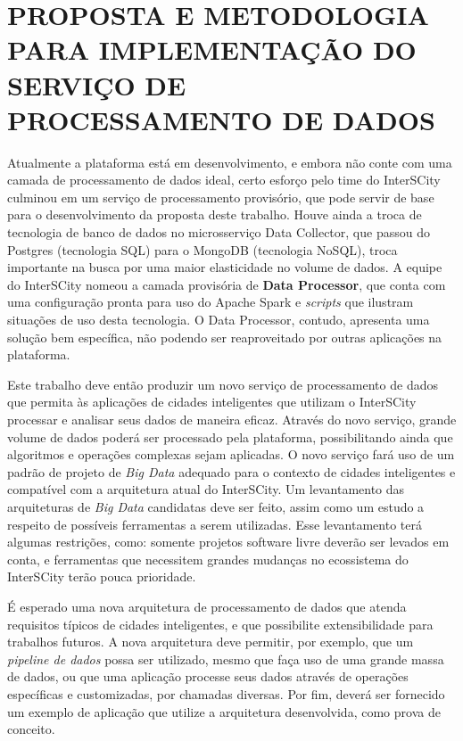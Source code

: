 \section{PROPOSTA E METODOLOGIA PARA IMPLEMENTAÇÃO DO SERVIÇO DE PROCESSAMENTO DE DADOS}

Atualmente a plataforma está em desenvolvimento, e embora não conte
com uma camada de processamento de dados ideal, certo esforço pelo time do
InterSCity culminou em um serviço de processamento provisório, que pode servir
de base para o desenvolvimento da proposta deste trabalho. Houve ainda a
troca de tecnologia de banco de dados no microsserviço Data Collector, que
passou do Postgres (tecnologia SQL) para o MongoDB (tecnologia NoSQL), troca
importante na busca por uma maior elasticidade no volume de dados. A equipe
do InterSCity nomeou a camada provisória de \textbf{Data Processor}, que
conta com uma configuração pronta para uso do Apache Spark e
\textit{scripts} que ilustram situações de uso desta tecnologia. O Data
Processor, contudo, apresenta uma solução bem específica, não podendo ser
reaproveitado por outras aplicações na plataforma.

Este trabalho deve então produzir um novo serviço de processamento de dados que
permita às aplicações de cidades inteligentes que utilizam o InterSCity
processar e analisar seus dados de maneira eficaz. Através do novo serviço,
grande volume de dados poderá ser processado pela plataforma, possibilitando
ainda que algoritmos e operações complexas sejam aplicadas. O novo serviço fará
uso de um padrão de projeto de \textit{Big Data} adequado para o contexto de cidades
inteligentes e compatível com a arquitetura atual do InterSCity. Um
levantamento das arquiteturas de \textit{Big Data} candidatas deve ser feito, assim
como um estudo a respeito de possíveis ferramentas a serem utilizadas. Esse
levantamento terá algumas restrições, como: somente projetos software livre
deverão ser levados em conta, e ferramentas que necessitem grandes mudanças no
ecossistema do InterSCity terão pouca prioridade.

É esperado uma nova arquitetura de processamento de dados que atenda
requisitos típicos de cidades inteligentes, e que possibilite extensibilidade
para trabalhos futuros. A nova arquitetura deve permitir, por exemplo, que um
\textit{pipeline de dados} possa ser utilizado, mesmo que faça uso de uma
grande massa de dados, ou que uma aplicação processe seus dados através de
operações específicas e customizadas, por chamadas diversas. 
Por fim, deverá ser fornecido um exemplo de aplicação que utilize a arquitetura
desenvolvida, como prova de conceito.
